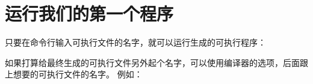 \section{运行我们的第一个程序}
{
    只要在命令行输入可执行文件的名字，就可以运行生成的可执行程序：

    \begin{codelist}
        
    \end{codelist}

    
    如果打算给最终生成的可执行文件另外起个名字，可以使用编译器的选项，后面跟上想要的可执行文件的名字。
    例如：

    \begin{codelist}
        
    \end{codelist}
}

\endinput
